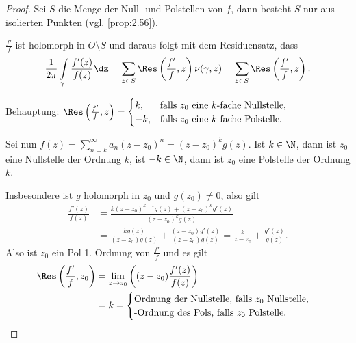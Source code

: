 \begin{proof}
Sei $S$ die Menge der Null- und Polstellen von $f$, dann besteht $S$ nur aus
isolierten Punkten (vgl. \ref{prop:2.56}).

$\frac{f'}{f}$ ist holomorph in $O\setminus S$ und daraus folgt mit dem
Residuensatz, dass
\begin{align*}
\frac{1}{2\pi}\int\limits_\gamma \frac{f'(z)}{f(z)}\dz = \sum\limits_{z\in S}
\Res\left(\frac{f'}{f},z\right)\nu(\gamma,z) = \sum\limits_{z\in S}
\Res\left(\frac{f'}{f},z\right).
\end{align*}

Behauptung: $\Res\left(\frac{f'}{f},z\right) = \begin{cases}
                                               k,&\text{falls }z_0\text{ eine }
                                               k\text{-fache Nullstelle},\\
                                               -k,&\text{falls }z_0\text{ eine
                                               }k\text{-fache Polstelle}.
                                               \end{cases}$

Sei nun $f(z) = \sum\limits_{n=k}^\infty a_n(z-z_0)^n = (z-z_0)^k g(z)$. Ist
$k\in\N$, dann ist $z_0$ eine Nullstelle der Ordnung $k$, ist $-k\in\N$, dann
ist $z_0$ eine Polstelle der Ordnung $k$.

Insbesondere ist $g$ holomorph in $z_0$ und $g(z_0)\neq 0$, also gilt
\begin{align*}
\frac{f'(z)}{f(z)} &= \frac{k(z-z_0)^{k-1}g(z)+(z-z_0)^kg'(z)}{(z-z_0)^kg(z)}
 \\ &=\frac{kg(z)}{(z-z_0)g(z)} + \frac{(z-z_0)g'(z)}{(z-z_0)g(z)}
 = \frac{k}{z-z_0} + \frac{g'(z)}{g(z)}.
\end{align*}
Also ist $z_0$ ein Pol 1. Ordnung von $\frac{f'}{f}$ und es gilt
\begin{align*}
\Res\left(\frac{f'}{f},z_0\right)&=\lim\limits_{z\to z_0}
\left((z-z_0)\frac{f'(z)}{f(z)}\right) \\&= k = \begin{cases}
                                             \text{Ordnung der Nullstelle,
                                             falls $z_0$ Nullstelle},\\
                                             \text{-Ordnung des Pols, falls
                                             $z_0$ Polstelle}.\qedhere
                                             \end{cases}
\end{align*}
\end{proof}

